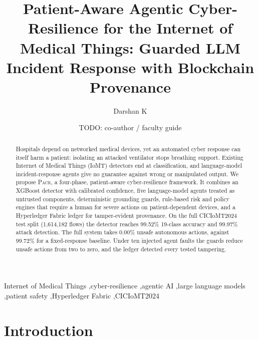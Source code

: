 \documentclass[preprint,12pt]{elsarticle}
\newcommand{\pacr}{\textsc{Pacr}}
\begin{document}
\begin{frontmatter}

\title{Patient-Aware Agentic Cyber-Resilience for the Internet of Medical Things:
Guarded LLM Incident Response with Blockchain Provenance}

\author[aff1]{Darshan K}
\author[aff1]{TODO: co-author / faculty guide}
\address[aff1]{Department of Electrical and Electronics Engineering, Amrita School of Engineering, Coimbatore, India}  %

\begin{abstract}
Hospitals depend on networked medical devices, yet an automated cyber response can itself harm a patient: isolating an attacked ventilator stops breathing support. Existing Internet of Medical Things (IoMT) detectors end at classification, and language-model incident-response agents give no guarantee against wrong or manipulated output. We propose \pacr, a four-phase, patient-aware cyber-resilience framework. It combines an XGBoost detector with calibrated confidence, five language-model agents treated as untrusted components, deterministic grounding guards, rule-based risk and policy engines that require a human for severe actions on patient-dependent devices, and a Hyperledger Fabric ledger for tamper-evident provenance. On the full CICIoMT2024 test split (1,614,182 flows) the detector reaches 99.52\% 19-class accuracy and 99.97\% attack detection. The full system takes 0.00\% unsafe autonomous actions, against 99.72\% for a fixed-response baseline. Under ten injected agent faults the guards reduce unsafe actions from two to zero, and the ledger detected every tested tampering.
\end{abstract}

\begin{keyword}
Internet of Medical Things \sep cyber-resilience \sep agentic AI \sep large language models \sep patient safety \sep Hyperledger Fabric \sep CICIoMT2024
\end{keyword}

\end{frontmatter}

\section{Introduction}
\label{sec:intro}
\end{document}
